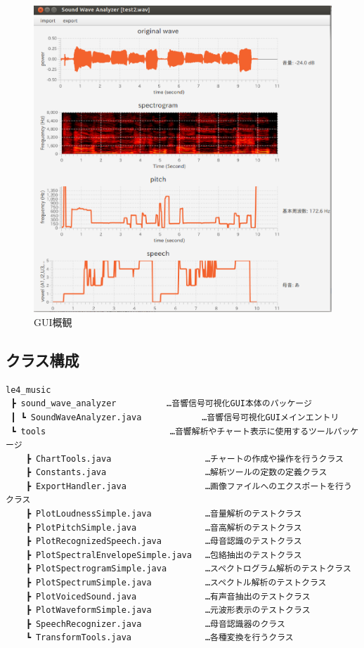 \documentclass[a4j]{jarticle}
\begin{document}
\begin{figure}[htbp]
  \begin{center}
   \includegraphics[scale=0.5]{gui.eps}
   \caption{GUI概観}
  \end{center}
\end{figure}


\subsection{クラス構成}
\begin{verbatim}
le4_music
 ┣ sound_wave_analyzer          …音響信号可視化GUI本体のパッケージ
 ┃ ┗ SoundWaveAnalyzer.java            …音響信号可視化GUIメインエントリ
 ┗ tools　                       …音響解析やチャート表示に使用するツールパッケージ
    ┣ ChartTools.java　                 …チャートの作成や操作を行うクラス
    ┣ Constants.java　                  …解析ツールの定数の定義クラス
    ┣ ExportHandler.java　              …画像ファイルへのエクスポートを行うクラス
    ┣ PlotLoudnessSimple.java　         …音量解析のテストクラス
    ┣ PlotPitchSimple.java　            …音高解析のテストクラス
    ┣ PlotRecognizedSpeech.java　       …母音認識のテストクラス
    ┣ PlotSpectralEnvelopeSimple.java　 …包絡抽出のテストクラス
    ┣ PlotSpectrogramSimple.java　      …スペクトログラム解析のテストクラス
    ┣ PlotSpectrumSimple.java　         …スペクトル解析のテストクラス
    ┣ PlotVoicedSound.java　            …有声音抽出のテストクラス
    ┣ PlotWaveformSimple.java　         …元波形表示のテストクラス
    ┣ SpeechRecognizer.java　           …母音認識器のクラス
    ┗ TransformTools.java　             …各種変換を行うクラス
\end{verbatim}
\end{document}
